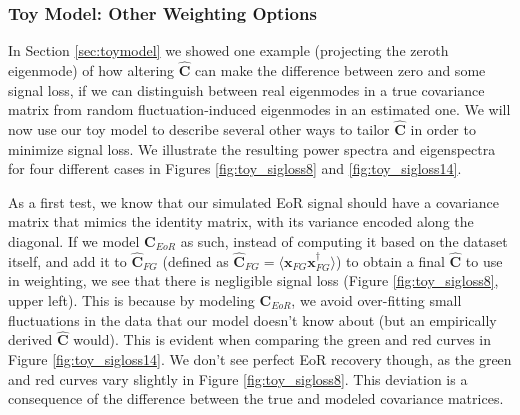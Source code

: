 \documentclass[preprint2,numberedappendix,tighten]{aastex6}  %
\begin{document}
\subsubsection{Toy Model: Other Weighting Options}
\label{sec:otherweight}

In Section \ref{sec:toymodel} we showed one example (projecting the zeroth eigenmode) of how altering $\hat{\textbf{C}}$ can make the difference between zero and some signal loss, if we can distinguish between real eigenmodes in a true covariance matrix from random fluctuation-induced eigenmodes in an estimated one. We will now use our toy model to describe several other ways to tailor $\hat{\textbf{C}}$ in order to minimize signal loss. We illustrate the resulting power spectra and eigenspectra for four different cases in Figures \ref{fig:toy_sigloss8} and \ref{fig:toy_sigloss14}.

As a first test, we know that our simulated EoR signal should have a covariance matrix that mimics the identity matrix, with its variance encoded along the diagonal. If we model $\textbf{C}_{EoR}$ as such, instead of computing it based on the dataset itself, and add it to $\hat{\textbf{C}}_{FG}$ (defined as $\hat{\textbf{C}}_{FG} = \langle\textbf{x}_{FG}\textbf{x}_{FG}^{\dagger}\rangle$) to obtain a final $\hat{\textbf{C}}$ to use in weighting, we see that there is negligible signal loss (Figure \ref{fig:toy_sigloss8}, upper left). This is because by modeling $\textbf{C}_{EoR}$, we avoid over-fitting small fluctuations in the data that our model doesn't know about (but an empirically derived $\hat{\textbf{C}}$ would). This is evident when comparing the green and red curves in Figure \ref{fig:toy_sigloss14}. We don't see perfect EoR recovery though, as the green and red curves vary slightly in Figure \ref{fig:toy_sigloss8}. This deviation is a consequence of the difference between the true and modeled covariance matrices.
\end{document}
